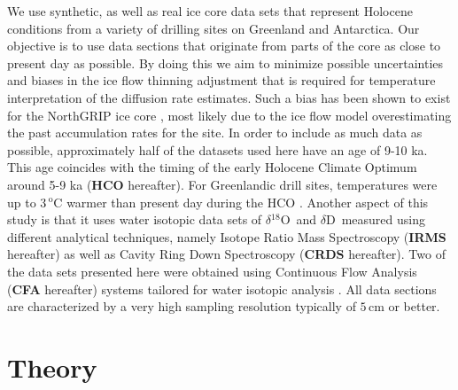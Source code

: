 \documentclass[11pt, draftcls, onecolumn]{IEEEtran} %
\numberwithin{equation}{section}
\numberwithin{table}{section}
\numberwithin{figure}{section}
\newcommand{\delOx}{$\delta{}^{18}\mathrm{O}$}
\newcommand{\delD}{$\delta\mathrm{D}$}
\begin{document}
We use synthetic, as well as real ice core data sets that represent 
Holocene conditions from a variety of drilling sites on Greenland and Antarctica.
Our objective is to use data sections that originate from parts of the core as close to present day 
as possible. By doing this we aim to minimize possible uncertainties and biases in the ice flow thinning
adjustment that is required for temperature interpretation of the diffusion rate estimates.
Such a bias has been shown to exist for the NorthGRIP ice core \citep{Gkinis2014}, most likely 
due to the \cite{DJmodel} ice flow model overestimating  the past accumulation rates for the site. 
In order to include as much data as possible, approximately half of the datasets used here
have an age of 9-10 ka. This age coincides with the timing of the early Holocene Climate Optimum around 5-9 ka (\textbf{HCO} hereafter). 
For Greenlandic drill sites, temperatures were up to $3 \,^\mathrm{o}$C warmer than present day during the HCO \citep{Dorthe1998}.
Another aspect of this study is that it uses water isotopic data sets of \delOx~and 
\delD~measured using different analytical techniques, namely Isotope Ratio Mass Spectroscopy 
(\textbf{IRMS} hereafter) as  well as Cavity Ring Down Spectroscopy (\textbf{CRDS} hereafter).
Two of the data sets presented here were obtained using Continuous Flow Analysis (\textbf{CFA} hereafter)
systems tailored for water isotopic analysis \citep{Gkinis2011}. All data sections are characterized by
a very high sampling resolution typically of $5\, \mathrm{cm}$ or better. 




\section{Theory}
\end{document}
